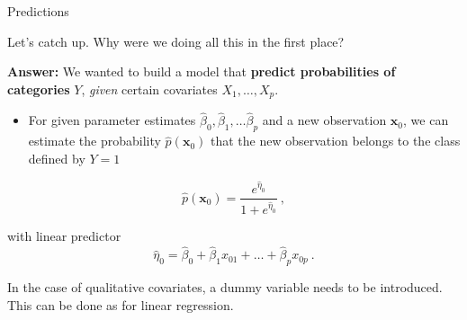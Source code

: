 \documentclass[
  10pt,
  ignorenonframetext,
]{beamer}
\providecommand{\tightlist}{%
  \setlength{\itemsep}{0pt}\setlength{\parskip}{0pt}}
\begin{document}
\begin{frame}[fragile]
\begin{block}{Predictions}
\protect\hypertarget{predictions}{}
\vspace{2mm}

Let's catch up. Why were we doing all this in the first place?

\vspace{2mm}

\textbf{Answer:} We wanted to build a model that \textbf{predict
probabilities of categories} \(Y\), \emph{given} certain covariates
\(X_1, \ldots, X_p\).

\vspace{2mm}

\begin{itemize}
\tightlist
\item
  For given parameter estimates
  \(\hat\beta_0, \hat\beta_1, \ldots \hat\beta_p\) and a new observation
  \({\boldsymbol x}_0\), we can estimate the probability
  \(\hat{p}({\boldsymbol x}_0)\) that the new observation belongs to the
  class defined by \(Y=1\)
\end{itemize}

\[\hat{p}({\boldsymbol x}_0) = \frac{e^{\hat{\eta}_0}}{1+e^{\hat{\eta}_0}} \ , \]

with linear predictor
\[\hat\eta_0 = \hat\beta_0 + \hat\beta_1 x_{01} + \ldots + \hat\beta_p x_{0p} \ .\]

In the case of qualitative covariates, a dummy variable needs to be
introduced. This can be done as for linear regression.
\end{block}
\end{frame}
\end{document}
